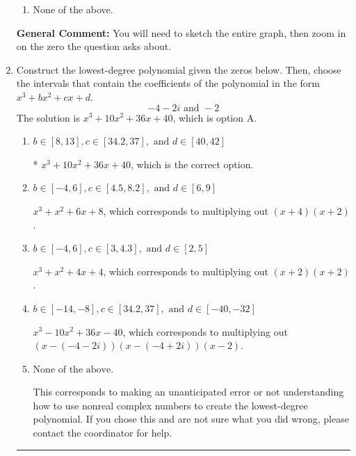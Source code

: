 \documentclass{extbook}[14pt]
\newcommand{\litem}[1]{\item #1

\rule{\textwidth}{0.4pt}}
\begin{document}
\begin{enumerate}
{\begin{enumerate}[label=\Alph*.]
\item None of the above.\end{enumerate}
\textbf{General Comment:} You will need to sketch the entire graph, then zoom in on the zero the question asks about.
}
\litem{
Construct the lowest-degree polynomial given the zeros below. Then, choose the intervals that contain the coefficients of the polynomial in the form $x^3+bx^2+cx+d$.
\[ -4 - 2 i \text{ and } -2 \]The solution is \( x^{3} +10 x^{2} +36 x + 40 \), which is option A.\begin{enumerate}[label=\Alph*.]
\item \( b \in [8, 13], c \in [34.2, 37], \text{ and } d \in [40, 42] \)

* $x^{3} +10 x^{2} +36 x + 40$, which is the correct option.
\item \( b \in [-4, 6], c \in [4.5, 8.2], \text{ and } d \in [6, 9] \)

$x^{3} + x^{2} +6 x + 8$, which corresponds to multiplying out $(x + 4)(x + 2)$.
\item \( b \in [-4, 6], c \in [3, 4.3], \text{ and } d \in [2, 5] \)

$x^{3} + x^{2} +4 x + 4$, which corresponds to multiplying out $(x + 2)(x + 2)$.
\item \( b \in [-14, -8], c \in [34.2, 37], \text{ and } d \in [-40, -32] \)

$x^{3} -10 x^{2} +36 x -40$, which corresponds to multiplying out $(x-(-4 - 2 i))(x-(-4 + 2 i))(x -2)$.
\item \( \text{None of the above.} \)

This corresponds to making an unanticipated error or not understanding how to use nonreal complex numbers to create the lowest-degree polynomial. If you chose this and are not sure what you did wrong, please contact the coordinator for help.
\end{enumerate}

}
\end{enumerate}
\end{document}
